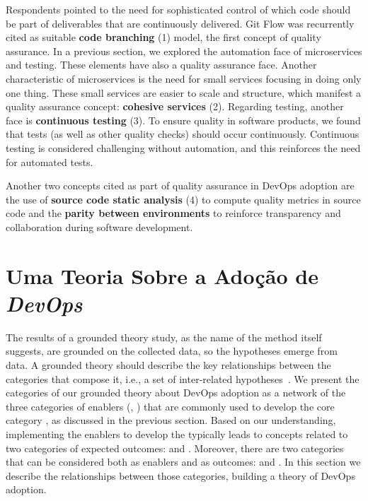 Respondents pointed to the need for sophisticated control of which code should
be part of deliverables that are continuously delivered. Git Flow was
recurrently cited as suitable \textbf{code branching} (1) model, the first
concept of quality assurance.
In a previous section, we explored the automation face of
microservices and testing. These elements have also a quality assurance face.
Another characteristic of microservices is the need for small services focusing
in doing only one thing. These small services are easier to scale and
structure, which manifest a quality assurance concept: \textbf{cohesive
services} (2). Regarding testing, another face is \textbf{continuous
testing} (3). To ensure quality in software products, we found that
tests (as well as other quality checks) should occur continuously. Continuous testing
is considered challenging without automation, and this reinforces the need for automated
tests.

Another two concepts cited as part of quality assurance in DevOps adoption are
the use of \textbf{source code static analysis} (4) to compute quality metrics in
source code and the \textbf{parity between environments} to
reinforce transparency and collaboration during software development.

\section{Uma Teoria Sobre a Adoção de \textit{DevOps}}

The results of a grounded theory study, as the name of the method itself
suggests, are grounded on the collected data, so the hypotheses emerge from
data. A grounded theory should describe the key relationships between the
categories that compose it, i.e., a set of inter-related hypotheses~\cite{hoda2017becoming}.
We present the categories of our grounded theory
about DevOps adoption as a network of the three categories of enablers (,
) that are commonly used to develop the core category
\cc, as discussed in the previous section. Based on our understanding,
implementing the enablers to develop the \cc typically leads
to concepts related to two categories of expected outcomes:
 and . Moreover, there are two categories that can be considered
both as enablers and as outcomes:  and .
In this section we describe the relationships between those categories, building a theory
of DevOps adoption.

